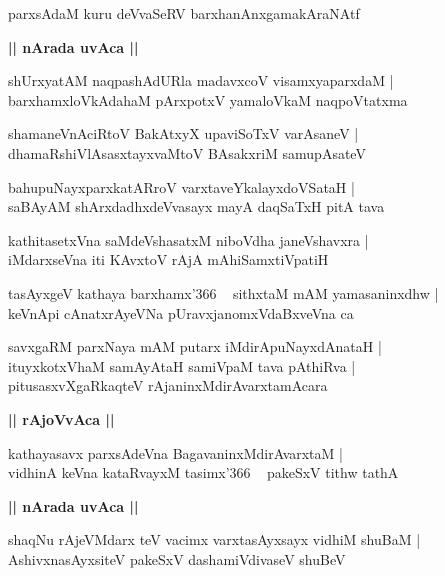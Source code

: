 \documentclass[twoside,12pt,openright]{book}
\newcounter{shloka}[chapter]
\def\uvaca#1{\centerline{{\large\textbf{#1}}}}
\begin{document}
\begin{shloka}%
parxsAdaM kuru deVvaSeRV barxhanAnxgamakAraNAtf
\end{shloka}

\uvaca{|| nArada uvAca ||}

\begin{shloka}%
shUrxyatAM naqpashAdURla madavxcoV visamxyaparxdaM |\\
barxhamxloVkAdahaM pArxpotxV yamaloVkaM naqpoVtatxma
\end{shloka}

\begin{shloka}%
shamaneVnAciRtoV BakAtxyX upaviSoTxV varAsaneV |\\
dhamaRshiVlAsasxtayxvaMtoV BAsakxriM samupAsateV 
\end{shloka}

\begin{shloka}%
bahupuNayxparxkatARroV varxtaveYkalayxdoVSataH |\\
saBAyAM shArxdadhxdeVvasayx mayA daqSaTxH pitA tava
\end{shloka}

\begin{shloka}%
kathitasetxVna saMdeVshasatxM niboVdha janeVshavxra |\\
iMdarxseVna iti KAvxtoV rAjA mAhiSamxtiVpatiH
\end{shloka}

\begin{shloka}%
tasAyxgeV kathaya barxhamx\char'366 ~ sithxtaM mAM yamasaninxdhw |\\
keVnApi cAnatxrAyeVNa pUravxjanomxVdaBxveVna ca
\end{shloka}

\begin{shloka}%
savxgaRM parxNaya mAM putarx iMdirApuNayxdAnataH |\\
ituyxkotxVhaM samAyAtaH samiVpaM tava pAthiRva |\\
pitusasxvXgaRkaqteV rAjaninxMdirAvarxtamAcara
\end{shloka}

\uvaca{|| rAjoVvAca ||}

\begin{shloka}%
kathayasavx parxsAdeVna BagavaninxMdirAvarxtaM |\\
vidhinA keVna kataRvayxM tasimx\char'366 ~ pakeSxV tithw tathA 
\end{shloka}

\uvaca{|| nArada uvAca ||}

\begin{shloka}%
shaqNu rAjeVMdarx teV vacimx varxtasAyxsayx vidhiM shuBaM |\\
AshivxnasAyxsiteV pakeSxV dashamiVdivaseV shuBeV 
\end{shloka}
\end{document}
